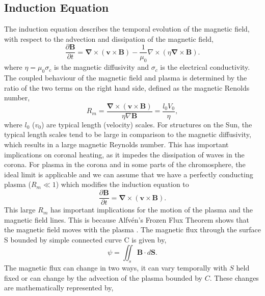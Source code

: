 \documentclass[12pt]{ociamthesis}
\newcommand{\bs}[1]{\boldsymbol{#1}}
\newcommand{\bn}{\boldsymbol{\nabla}}
\begin{document}
\subsection{Induction Equation}
\label{section:cont_eq}
The induction equation describes the temporal evolution of the magnetic field, with respect to the advection and dissipation of the magnetic field,
\begin{equation}\label{eq89}
\frac{\partial \boldsymbol{B}}{\partial t} = \bn \times (\boldsymbol{v} \times \boldsymbol{B}) - \frac{1}{\mu_0} \nabla \times (\eta \bn \times \boldsymbol{B}).
\end{equation}
where $\eta= \mu_0 \sigma_c$ is the magnetic diffusivity and $\sigma_c$ is the electrical conductivity. The coupled behaviour of the magnetic field and plasma is determined by the ratio of the two terms on the right hand side, defined as the magnetic Renolds number,
\begin{equation}
    R_m = \frac{\bn \times (\boldsymbol{v} \times \boldsymbol{B})}{\eta \nabla \bs{B}}=\frac{l_0 V_0}{\eta},
\end{equation}
where $l_0$ ($v_0$) are typical length (velocity) scales. For structures on the Sun, the typical length scales tend to be large in comparison to the magnetic diffusivity, which results in a large magnetic Reynolds number. This has important implications on coronal heating, as it impedes the dissipation of waves in the corona. For plasma in the corona and in some parts of the chromosphere, the ideal limit is applicable and we can assume that we have a perfectly conducting plasma ($R_m\ll1$) which modifies the induction equation to
\begin{equation}\label{perf_induct}
\frac{\partial \boldsymbol{B}}{\partial t} = \bn \times (\boldsymbol{v} \times \boldsymbol{B}).
\end{equation}
This large $R_m$ has important implications for the motion of the plasma and the magnetic field lines. This is because Alfv\'{e}n's Frozen Flux Theorem shows that the magnetic field moves with the plasma \citep{priest2014magnetohydrodynamics}. The magnetic flux through the surface S bounded by simple connected curve C is given by,
\begin{equation}
    \psi = \iint_s \bs{B} \cdot d\bs{S}.
\end{equation}
The magnetic flux can change in two ways, it can vary temporally with $S$ held fixed or can change by the advection of the plasma bounded by $C$. These changes are mathematically represented by,
\end{document}
